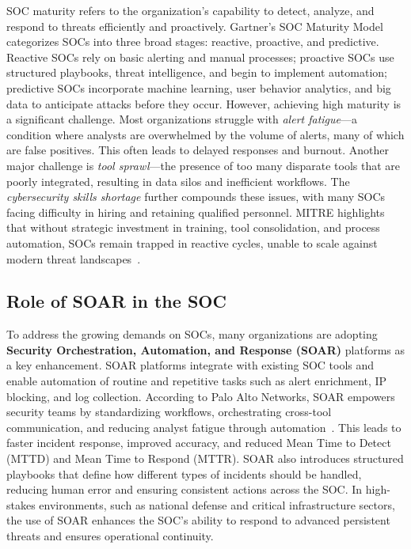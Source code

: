 SOC maturity refers to the organization's capability to detect, analyze, and respond to threats efficiently and proactively. Gartner’s SOC Maturity Model categorizes SOCs into three broad stages: reactive, proactive, and predictive. Reactive SOCs rely on basic alerting and manual processes; proactive SOCs use structured playbooks, threat intelligence, and begin to implement automation; predictive SOCs incorporate machine learning, user behavior analytics, and big data to anticipate attacks before they occur. However, achieving high maturity is a significant challenge. Most organizations struggle with \textit{alert fatigue}—a condition where analysts are overwhelmed by the volume of alerts, many of which are false positives. This often leads to delayed responses and burnout. Another major challenge is \textit{tool sprawl}—the presence of too many disparate tools that are poorly integrated, resulting in data silos and inefficient workflows. The \textit{cybersecurity skills shortage} further compounds these issues, with many SOCs facing difficulty in hiring and retaining qualified personnel. MITRE highlights that without strategic investment in training, tool consolidation, and process automation, SOCs remain trapped in reactive cycles, unable to scale against modern threat landscapes~\cite{mitre}.

\subsection{Role of SOAR in the SOC}

To address the growing demands on SOCs, many organizations are adopting \textbf{Security Orchestration, Automation, and Response (SOAR)} platforms as a key enhancement. SOAR platforms integrate with existing SOC tools and enable automation of routine and repetitive tasks such as alert enrichment, IP blocking, and log collection. According to Palo Alto Networks, SOAR empowers security teams by standardizing workflows, orchestrating cross-tool communication, and reducing analyst fatigue through automation~\cite{paloalto}. This leads to faster incident response, improved accuracy, and reduced Mean Time to Detect (MTTD) and Mean Time to Respond (MTTR). SOAR also introduces structured playbooks that define how different types of incidents should be handled, reducing human error and ensuring consistent actions across the SOC. In high-stakes environments, such as national defense and critical infrastructure sectors, the use of SOAR enhances the SOC’s ability to respond to advanced persistent threats and ensures operational continuity.
